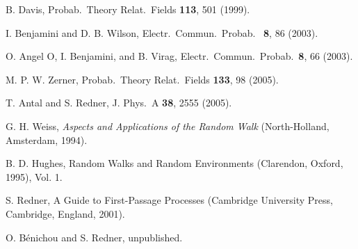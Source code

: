 \documentclass[11pt]{article}
\begin{document}
\begin{thebibliography}{99}
 B. Davis,  Probab.\ Theory Relat.\ Fields {\bf 113}, 501 (1999).

 I. Benjamini and D. B. Wilson, Electr.\ Commun.\ Probab.\ {\bf
    8}, 86 (2003).

 O. Angel O, I. Benjamini, and B. Virag, Electr.\ Commun.\
  Probab.\ {\bf 8}, 66 (2003).

 M. P. W. Zerner, Probab.\ Theory Relat.\ Fields {\bf 133}, 98 (2005).

 T. Antal and S. Redner, J. Phys.\ A {\bf 38}, 2555 (2005).

 G. H. Weiss, \textit{Aspects and Applications of the Random Walk}
(North-Holland, Amsterdam, 1994).

 B. D. Hughes, Random Walks and Random Environments (Clarendon,
  Oxford, 1995), Vol. 1.


 S. Redner, A Guide to First-Passage Processes (Cambridge
  University Press, Cambridge, England, 2001).

 O. B\'enichou and S. Redner, unpublished.

\end{thebibliography}
\end{document}
